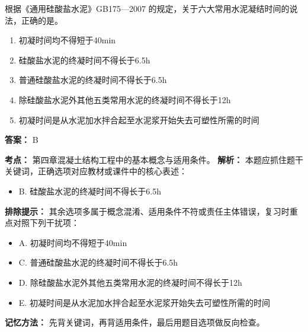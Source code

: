 \documentclass[UTF8,fontset=fandol,11pt]{ctexart}
\begin{document}
\begin{quizbox}[title={第 32 题}]
根据《通用硅酸盐水泥》GB175—2007 的规定，关于六大常用水泥凝结时间的说法，正确的是。\\
\begin{enumerate}[label=\Alph*.]
\item 初凝时间均不得短于40min
\item 硅酸盐水泥的终凝时间不得长于6.5h
\item 普通硅酸盐水泥的终凝时间不得长于6.5h
\item 除硅酸盐水泥外其他五类常用水泥的终凝时间不得长于12h
\item 初凝时间是从水泥加水拌合起至水泥浆开始失去可塑性所需的时间
\end{enumerate}
\textbf{答案：} B
\vspace{0.25em}
\begin{answerbox}[title={考点解析}]
\textbf{考点：} 第四章混凝土结构工程中的基本概念与适用条件。
\textbf{解析：} 本题应抓住题干关键词，正确选项对应教材或课件中的核心表述：
\begin{itemize}
\item B. 硅酸盐水泥的终凝时间不得长于6.5h
\end{itemize}
\textbf{排除提示：} 其余选项多属于概念混淆、适用条件不符或责任主体错误，复习时重点对照下列干扰项：
\begin{itemize}
\item A. 初凝时间均不得短于40min
\item C. 普通硅酸盐水泥的终凝时间不得长于6.5h
\item D. 除硅酸盐水泥外其他五类常用水泥的终凝时间不得长于12h
\item E. 初凝时间是从水泥加水拌合起至水泥浆开始失去可塑性所需的时间
\end{itemize}
\textbf{记忆方法：} 先背关键词，再背适用条件，最后用题目选项做反向检查。
\end{answerbox}
\end{quizbox}

\vspace{0.2em}
\end{document}
